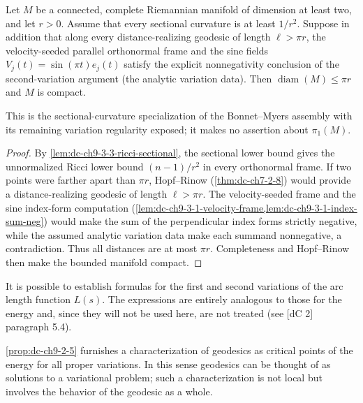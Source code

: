 \begin{lemma}
  \label{lem:dc-ch9-3-3-sectional-analytic}
  \leanok
  Let $M$ be a connected, complete Riemannian manifold of dimension at least two, and let
  $r>0$. Assume that every sectional curvature is at least $1/r^2$. Suppose in addition that
  along every distance-realizing geodesic of length $\ell>\pi r$, the velocity-seeded parallel
  orthonormal frame and the sine fields $V_j(t)=\sin(\pi t)e_j(t)$ satisfy the explicit
  nonnegativity conclusion of the second-variation argument (the analytic variation data).
  Then $\operatorname{diam}(M)\le\pi r$ and $M$ is compact.

  This is the sectional-curvature specialization of the Bonnet--Myers assembly with its
  remaining variation regularity exposed; it makes no assertion about $\pi_1(M)$.
\end{lemma}
\begin{proof}
  \leanok
  By \cref{lem:dc-ch9-3-3-ricci-sectional}, the sectional lower bound gives the unnormalized
  Ricci lower bound $(n-1)/r^2$ in every orthonormal frame. If two points were farther apart
  than $\pi r$, Hopf--Rinow (\cref{thm:dc-ch7-2-8}) would provide a distance-realizing geodesic
  of length $\ell>\pi r$. The velocity-seeded frame and the sine index-form computation
  (\cref{lem:dc-ch9-3-1-velocity-frame,lem:dc-ch9-3-1-index-sum-neg}) would make the sum of
  the perpendicular index forms strictly negative, while the assumed analytic variation data
  make each summand nonnegative, a contradiction. Thus all distances are at most $\pi r$.
  Completeness and Hopf--Rinow then make the bounded manifold compact.
\end{proof}

\begin{remark}[Remark 2.11]
  \label{rem:dc-ch9-2-11}
  It is possible to establish formulas for the first and second variations of the
  arc length function $L(s)$. The expressions are entirely analogous to those for the
  energy and, since they will not be used here, are not treated (see [dC 2]
  paragraph 5.4).
\end{remark}

\begin{remark}[Remark 2.6]
  \label{rem:dc-ch9-2-6}
  \cref{prop:dc-ch9-2-5} furnishes a characterization of geodesics as critical points of
  the energy for all proper variations. In this sense geodesics can be thought of as
  solutions to a variational problem; such a characterization is not local but
  involves the behavior of the geodesic as a whole.
\end{remark}

